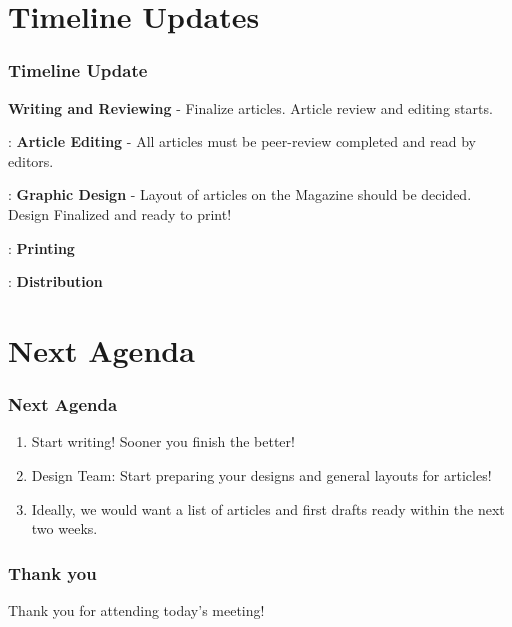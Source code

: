 \documentclass{beamer}
\begin{document}
\section{Timeline Updates}
\begin{frame}
    \frametitle{Timeline Update}

        \begin{description}
            \item<1->[September 30 to October 14] \textbf{Writing and Reviewing} - Finalize articles. Article review and editing starts.

            \item<2->[October 14 to October 18]: \textbf{Article Editing} - All articles must be peer-review completed and read by editors.

            \item<3->[October 18 to October 25]: \textbf{Graphic Design} - Layout of articles on the Magazine should be decided. Design Finalized and ready to print! 

            \item<4->[October 26 to October 30]: \textbf{Printing}

            \item<5->[November 2 to November 20]: \textbf{Distribution} 
        \end{description}   
\end{frame}


\section{Next Agenda}
\begin{frame}
    \frametitle{Next Agenda}

    \begin{enumerate}
        \item<1-> Start writing! Sooner you finish the better!

        \item<2-> Design Team: Start preparing your designs and general layouts for articles!

        \item<3-> Ideally, we would want a list of articles and first drafts ready within the next two weeks.
    \end{enumerate}

\end{frame}

\begin{frame}
    \frametitle{Thank you}

    Thank you for attending today's meeting!

\end{frame}
\end{document}
